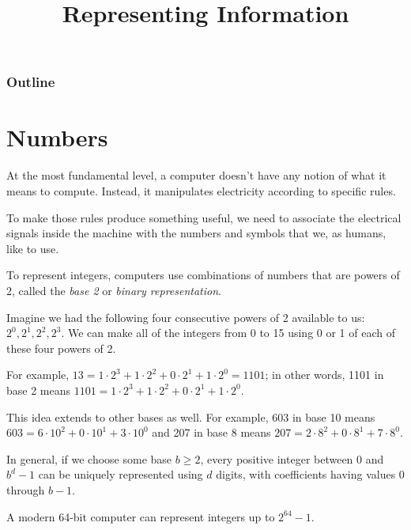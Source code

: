 \documentclass[8pt,a4paper,compress,handout]{beamer}
\title{Representing Information}
\date{}
\begin{document}
\begin{frame}
\vfill
\titlepage
\end{frame}

\begin{frame}
\frametitle{Outline}
\tableofcontents
\end{frame}

\section{Numbers}
\begin{frame}[fragile]
At the most fundamental level, a computer doesn't have any notion of what it means to compute. Instead, it manipulates electricity according to specific rules.

\bigskip

To make those rules produce something useful, we need to associate the electrical signals inside the machine with the numbers and symbols that we, as humans, like to use.
\end{frame}

\begin{frame}[fragile]
To represent integers, computers use combinations of numbers that are powers of 2, called the \emph{base 2} or \emph{binary representation}.

\bigskip

Imagine we had the following four consecutive powers of 2 available to us: $2^0, 2^1, 2^2, 2^3$. We can make all of the integers from 0 to 15 using 0 or 1 of each of these four powers of 2. 

\bigskip

For example, $13 = 1 \cdot 2^3 + 1 \cdot 2^2 + 0 \cdot 2^1 + 1 \cdot 2^0 = 1101$; in other words, 1101 in base 2 means $1101 = 1 \cdot 2^3 + 1 \cdot 2^2 + 0 \cdot 2^1 + 1 \cdot 2^0$.

\bigskip

This idea extends to other bases as well. For example, 603 in base 10 means $603 = 6 \cdot 10^2 + 0 \cdot 10^1 + 3 \cdot 10^0$ and 207 in base 8 means $207 = 2 \cdot 8^2 + 0 \cdot 8^1 + 7 \cdot 8^0$. 

\bigskip

In general, if we choose some base $b \geq 2$, every positive integer between 0 and $b^d-1$ can be uniquely represented using $d$ digits, with coefficients having values 0 through $b-1$.

\bigskip

A modern 64-bit computer can represent integers up to $2^{64} - 1$.
\end{frame}
\end{document}
